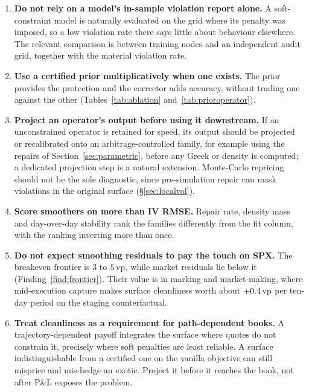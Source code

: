\begin{enumerate}[label=(\roman*),leftmargin=*]

\item \textbf{Do not rely on a model's in-sample violation report alone.} A soft-constraint
model is naturally evaluated on the grid where its penalty was imposed, so a low violation rate
there says little about behaviour elsewhere. The relevant comparison is between training nodes
and an independent audit grid, together with the material violation rate.

\item \textbf{Use a certified prior multiplicatively when one exists.} The prior provides the
protection and the corrector adds accuracy, without trading one against the other
(Tables~\ref{tab:ablation} and~\ref{tab:prioroperator}).

\item \textbf{Project an operator's output before using it downstream.} If an unconstrained
operator is retained for speed, its output should be projected or recalibrated onto an
arbitrage-controlled family, for example using the repairs of Section~\ref{sec:parametric},
before any Greek or density is computed; a dedicated projection step is a natural extension.
Monte-Carlo repricing should not be the sole diagnostic, since pre-simulation repair can mask
violations in the original surface (\S\ref{sec:localvol}).

\item \textbf{Score smoothers on more than IV RMSE.} Repair rate, density mass and
day-over-day stability rank the families differently from the fit column, with the ranking
inverting more than once.

\item \textbf{Do not expect smoothing residuals to pay the touch on SPX.} The breakeven
frontier is $3$ to $5\,\text{vp}$, while market residuals lie below it
(Finding~\ref{find:frontier}). Their value is in marking and market-making, where mid-execution
capture makes surface cleanliness worth about $+0.4\,\text{vp}$ per ten-day period on the staging
counterfactual.

\item \textbf{Treat cleanliness as a requirement for path-dependent books.} A trajectory-dependent
payoff integrates the surface where quotes do not constrain it, precisely where soft penalties
are least reliable. A surface indistinguishable from a certified one on the vanilla objective
can still misprice and mis-hedge an exotic. Project it before it reaches the book, not after
P\&L exposes the problem.

\end{enumerate}